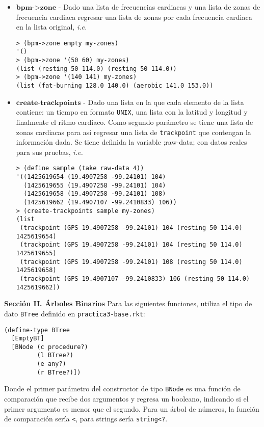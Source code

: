 \documentclass{article}
\begin{document}
\begin{itemize}
\item $\textbf{bpm->zone}$ - Dado una lista de frecuencias cardiacas y una lista de zonas de frecuencia cardiaca regresar una lista de zonas por cada frecuencia cardiaca en la lista original, \textit{i.e.}
\begin{verbatim}
> (bpm->zone empty my-zones)
'()
> (bpm->zone '(50 60) my-zones) 
(list (resting 50 114.0) (resting 50 114.0))
> (bpm->zone '(140 141) my-zones) 
(list (fat-burning 128.0 140.0) (aerobic 141.0 153.0))
\end{verbatim}

\item $\textbf{create-trackpoints}$ - Dado una lista en la que cada elemento de la lista contiene: un tiempo en formato \verb;UNIX;, una lista con la latitud y longitud y finalmente el ritmo cardiaco. Como segundo parámetro se tiene una lista de zonas cardiacas para así regresar una lista de \verb;trackpoint; que contengan la información dada. Se tiene definida la variable \verbr;raw-data; con datos reales para sus pruebas, \textit{i.e.}
\begin{verbatim}
> (define sample (take raw-data 4))
'((1425619654 (19.4907258 -99.24101) 104)
  (1425619655 (19.4907258 -99.24101) 104)
  (1425619658 (19.4907258 -99.24101) 108)
  (1425619662 (19.4907107 -99.2410833) 106))
> (create-trackpoints sample my-zones)
(list
 (trackpoint (GPS 19.4907258 -99.24101) 104 (resting 50 114.0) 1425619654)
 (trackpoint (GPS 19.4907258 -99.24101) 104 (resting 50 114.0) 1425619655)
 (trackpoint (GPS 19.4907258 -99.24101) 108 (resting 50 114.0) 1425619658)
 (trackpoint (GPS 19.4907107 -99.2410833) 106 (resting 50 114.0) 1425619662))
\end{verbatim}

\end{itemize}

\textbf{Sección II. Árboles Binarios}
Para las siguientes funciones, utiliza el tipo de dato \verb;BTree;
definido en \verb;practica3-base.rkt;:
\begin{verbatim}
(define-type BTree
  [EmptyBT]
  [BNode (c procedure?)
         (l BTree?)
         (e any?)
         (r BTree?)])
\end{verbatim}

Donde el primer parámetro del constructor de tipo \verb;BNode; es una función de comparación que recibe dos argumentos y regresa un booleano, indicando si el primer argumento es menor que el segundo. Para un árbol de números, la función de comparación sería \verb;<;, para strings sería \verb;string<?;. \\
    
\end{document}
